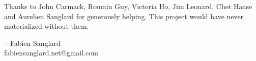 Thanks to John Carmack, Romain Guy, Victoria Ho, Jim Leonard, Chet Haase and Aurelien Sanglard for generously helping. This project would have never
materialized without them.\\ 
\par
-- Fabien Sanglard\\
fabiensanglard.net@gmail.com
